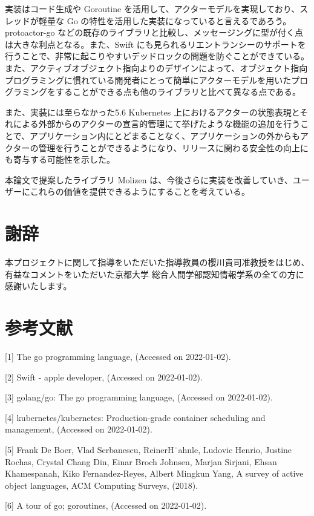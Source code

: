 実装はコード生成や Goroutine
を活用して、アクターモデルを実現しており、スレッドが軽量な Go
の特性を活用した実装になっていると言えるであろう。 protoactor-go
などの既存のライブラリと比較し、メッセージングに型が付く点は大きな利点となる。また、Swift
にも見られるリエントランシーのサポートを行うことで、非常に起こりやすいデッドロックの問題を防ぐことができている。
また、アクティブオブジェクト指向よりのデザインによって、オブジェクト指向プログラミングに慣れている開発者にとって簡単にアクターモデルを用いたプログラミングをすることができる点も他のライブラリと比べて異なる点である。

また、実装には至らなかった5.6 Kubernetes
上におけるアクターの状態表現とそれによる外部からのアクターの宣言的管理にて挙げたような機能の追加を行うことで、アプリケーション内にとどまることなく、アプリケーションの外からもアクターの管理を行うことができるようになり、リリースに関わる安全性の向上にも寄与する可能性を示した。

本論文で提案したライブラリ Molizen
は、今後さらに実装を改善していき、ユーザーにこれらの価値を提供できるようにすることを考えている。

\section{謝辞}

本プロジェクトに関して指導をいただいた指導教員の櫻川貴司准教授をはじめ、有益なコメントをいただいた京都大学
総合人間学部認知情報学系の全ての方に感謝いたします。

\section{参考文献}

{[}1{]} The go programming language, (Accessed
on 2022-01-02).

{[}2{]} Swift - apple developer,
(Accessed on 2022-01-02).

{[}3{]} golang/go: The go programming language,
(Accessed on 2022-01-02).

{[}4{]} kubernetes/kubernetes: Production-grade container scheduling and
management, (Accessed on 2022-01-02).

{[}5{]} Frank De Boer, Vlad Serbanescu, ReinerH¨ahnle, Ludovic Henrio,
Justine Rochas, Crystal Chang Din, Einar Broch Johnsen, Marjan Sirjani,
Ehsan Khamespanah, Kiko Fernandez-Reyes, Albert Mingkun Yang, A survey
of active object languages, ACM Computing Surveys, (2018).

{[}6{]} A tour of go; goroutines,
(Accessed on 2022-01-02).


